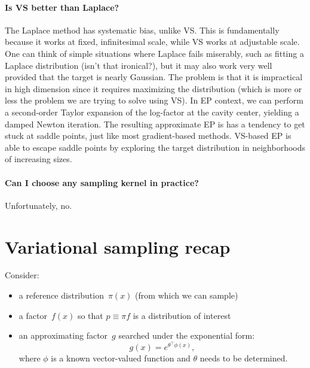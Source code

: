 \documentclass{article}
\begin{document}

\paragraph{Is VS better than Laplace?} The Laplace method has systematic bias, unlike VS. This is fundamentally because it works at fixed, infinitesimal scale, while VS works at adjustable scale. One can think of simple situations where Laplace fails miserably, such as fitting a Laplace distribution (isn't that ironical?), but it may also work very well provided that the target is nearly Gaussian. The problem is that it is impractical in high dimension since it requires maximizing the distribution (which is more or less the problem we are trying to solve using VS). In EP context, we can perform a second-order Taylor expansion of the log-factor at the cavity center, yielding a damped Newton iteration. The resulting approximate EP is has a tendency to get stuck at saddle points, just like most gradient-based methods. VS-based EP is able to escape saddle points by exploring the target distribution in neighborhoods of increasing sizes. 


\paragraph{Can I choose any sampling kernel in practice?} Unfortunately, no.



\section{Variational sampling recap}

Consider:
\begin{itemize}
\item a reference distribution~$\pi(x)$ (from which we can sample)
\item a factor~$f(x)$ so that $p\equiv \pi f$ is a distribution of interest
\item an approximating factor~$g$ searched under the exponential form:
  $$
  g(x) = e^{\theta^\top \phi(x)},
  $$ where $\phi$ is a known vector-valued function and $\theta$ needs
  to be determined.
\end{itemize}
\end{document}
